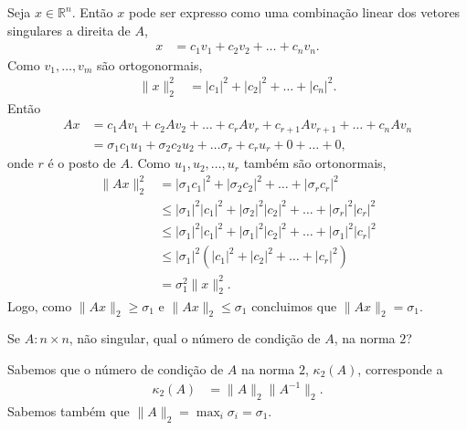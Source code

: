 \documentclass[a4paper,12pt, leqno, answers]{exam}
\begin{document}
\begin{questions}
\begin{solution}
        Seja $x \in \mathbb{R}^n$. Ent\~{a}o $x$ pode ser expresso como uma combina\c{c}\~{a}o linear dos vetores singulares a direita de $A$,
        \begin{align*}
            x &= c_1 v_1 + c_2 v_2 + \ldots + c_n v_n.
        \end{align*}
        Como $v_1, \ldots, v_m$ s\~{a}o ortogonormais,
        \begin{align*}
            \| x \|_2^2 &= | c_1 |^2 + | c_2 |^2 + \ldots + | c_n |^2.
        \end{align*}
        Ent\~{a}o
        \begin{align*}
            A x &= c_1 A v_1 + c_2 A v_2 + \ldots + c_r A v_r + c_{r + 1} A v_{r + 1} + \ldots + c_n A v_n \\
            &= \sigma_1 c_1 u_1 + \sigma_2 c_2 u_2 + \ldots \sigma_r + c_r u_r + 0 + \ldots + 0,
        \end{align*}
        onde $r$ \'{e} o posto de $A$. Como $u_1, u_2, \ldots, u_r$ tamb\'{e}m s\~{a}o ortonormais,
        \begin{align*}
            \| A x \|_2^2 &= | \sigma_1 c_1 |^2 + | \sigma_2 c_2 |^2 + \ldots + | \sigma_r c_r |^2 \\
            &\leq | \sigma_1 |^2 | c_1 |^2 + | \sigma_2 |^2 | c_2 |^2 + \ldots + | \sigma_r |^2 | c_r |^2 \\
            &\leq | \sigma_1 |^2 | c_1 |^2 + | \sigma_1 |^2 | c_2 |^2 + \ldots + | \sigma_1 |^2 | c_r |^2 \\
            &\leq | \sigma_1 |^2 \left( | c_1 |^2 + | c_2 |^2 + \ldots + | c_r |^2 \right) \\
            &= \sigma_1^2 \| x \|_2^2.
        \end{align*}
        Logo, como $\| A x \|_2 \geq \sigma_1$ e $\| A x \|_2 \leq \sigma_1$ concluimos que $\| A x \|_2 = \sigma_1$.
    \end{solution}

     Se $A : n \times n$, n\~{a}o singular, qual o n\'{u}mero de condi\c{c}\~{a}o de $A$, na norma $2$?
    \begin{solution}
        Sabemos que o n\'{u}mero de condi\c{c}\~{a}o de $A$ na norma $2$, $\kappa_2(A)$, corresponde a
        \begin{align*}
            \kappa_2(A) &= \| A \|_2 \| A^{-1} \|_2.
        \end{align*}
        Sabemos tamb\'{e}m que $\| A \|_2 = \max_i \sigma_i = \sigma_1$.


\end{solution}
\end{questions}
\end{document}
